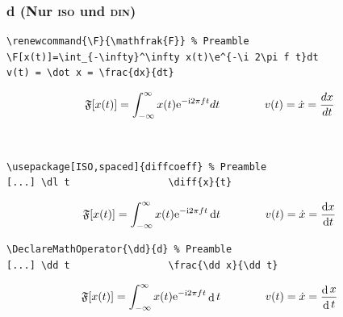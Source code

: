\documentclass{beamer}
\DeclareMathOperator{\dd}{d}
\newcommand{\e}{\mathrm{e}}
\renewcommand{\i}{\mathrm{i}}
\begin{document}
\begin{frame}[fragile]
    \frametitle{d (Nur \textsc{iso} und \textsc{din})}
    \begin{wrong}
        \begin{lstlisting}
\renewcommand{\F}{\mathfrak{F}} % Preamble
\F[x(t)]=\int_{-\infty}^\infty x(t)\e^{-\i 2\pi f t}dt
v(t) = \dot x = \frac{dx}{dt}
        \end{lstlisting}
        \begin{equation*}
            \F[x(t)]=\int_{-\infty}^\infty x(t) \e^{-\i 2 \pi f t} d t
            \qquad\qquad
            v(t) = \dot x = \frac{dx}{dt}
        \end{equation*}
    \end{wrong}\\[2ex]
    \pause

    \begin{lstlisting}
\usepackage[ISO,spaced]{diffcoeff} % Preamble
[...] \dl t                 \diff{x}{t}
    \end{lstlisting}
    \begin{equation*}
        \F[x(t)]=\int_{-\infty}^\infty x(t)\e^{-\i 2 \pi f t}\dl t
        \qquad\qquad
        v(t) = \dot x = \diff{x}{t}
    \end{equation*}
    \pause

    \begin{lstlisting}
\DeclareMathOperator{\dd}{d} % Preamble
[...] \dd t                 \frac{\dd x}{\dd t}
        \end{lstlisting}
    \begin{equation*}
        \F[x(t)]=\int_{-\infty}^\infty x(t)\e^{-\i 2\pi f t}\dd t
        \qquad\qquad
        v(t) = \dot x = \frac{\dd x}{\dd t}
    \end{equation*}
\end{frame}
\end{document}
